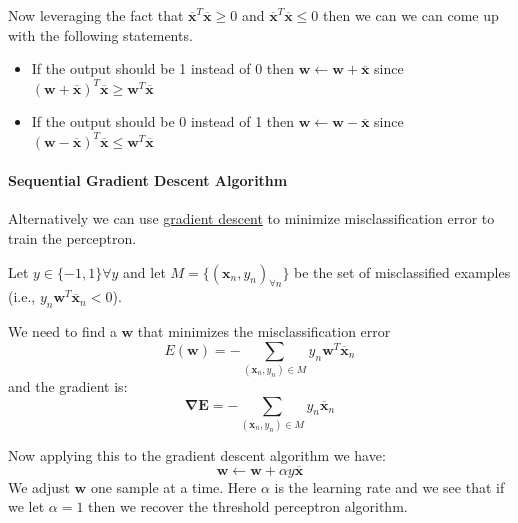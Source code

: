 \documentclass[12pt]{article}
\begin{document}
                Now leveraging the fact that $\overline{\boldsymbol{x}}^T\overline{\boldsymbol{x}} \geq 0$ and
                $\overline{\boldsymbol{x}}^T\overline{\boldsymbol{x}} \leq 0$ then we can we can come up with the following
                statements. 
                \begin{itemize}
                    \item If the output should be 1 instead of 0 then $\boldsymbol{w} \leftarrow \boldsymbol{w} +
                    \overline{\boldsymbol{x}}$ since $(\boldsymbol{w} + \overline{\boldsymbol{x}})^T\overline{\boldsymbol{x}}
                    \geq \boldsymbol{w}^T\overline{\boldsymbol{x}}$
                    \item If the output should be 0 instead of 1 then $\boldsymbol{w} \leftarrow \boldsymbol{w} -
                    \overline{\boldsymbol{x}}$ since $(\boldsymbol{w} - \overline{\boldsymbol{x}})^T\overline{\boldsymbol{x}}
                    \leq \boldsymbol{w}^T\overline{\boldsymbol{x}}$
                \end{itemize}
            
            \paragraph{Sequential Gradient Descent Algorithm}
                Alternatively we can use \hyperref[sec:GD]{gradient descent} to minimize misclassification error to
                train the perceptron. 

                Let $y \in \{-1, 1\} \forall y$ and let $M = \{(\boldsymbol{x}_n, y_n)_{\forall n}\}$ be the set of
                misclassified examples (i.e., $y_n \boldsymbol{w}^T\overline{\boldsymbol{x}}_n < 0$).

                We need to find a $\boldsymbol{w}$ that minimizes the misclassification error
                $$ E(\boldsymbol{w}) = -\sum_{(\boldsymbol{x}_n, y_n)\in M} y_n
                \boldsymbol{w}^T\overline{\boldsymbol{x}}_n $$
                and the gradient is:
                $$ \boldsymbol{\nabla E} = -\sum_{(\boldsymbol{x}_n, y_n)\in M} y_n \overline{\boldsymbol{x}}_n $$

                Now applying this to the gradient descent algorithm we have:
                $$ \boldsymbol{w} \leftarrow \boldsymbol{w} + \alpha y \overline{\boldsymbol{x}} $$
                We adjust $\boldsymbol{w}$ one sample at a time. Here $\alpha$ is the learning rate and we see that if
                we let $\alpha = 1$ then we recover the threshold perceptron algorithm.
            
\end{document}
